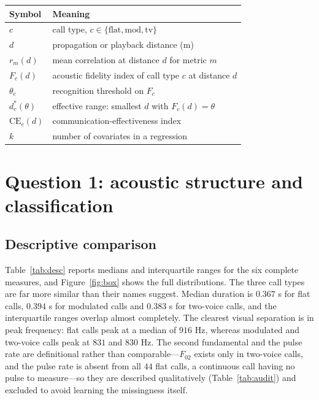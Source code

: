 \documentclass{apmcmthesis}
\begin{document}
\begin{center}
\footnotesize
\begin{tabular}{ll}
\toprule
Symbol & Meaning\\
\midrule
$c$ & call type, $c\in\{\text{flat},\text{mod},\text{tv}\}$\\
$d$ & propagation or playback distance (m)\\
$r_{m}(d)$ & mean correlation at distance $d$ for metric $m$\\
$F_c(d)$ & acoustic fidelity index of call type $c$ at distance $d$\\
$\theta_c$ & recognition threshold on $F_c$\\
$d^{*}_{c}(\theta)$ & effective range: smallest $d$ with $F_c(d)=\theta$\\
$\mathrm{CE}_c(d)$ & communication-effectiveness index\\
$k$ & number of covariates in a regression\\
\bottomrule
\end{tabular}
\end{center}

\section{Question 1: acoustic structure and classification}\label{sec:q1}

\subsection{Descriptive comparison}

Table~\ref{tab:desc} reports medians and interquartile ranges for the six complete
measures, and Figure~\ref{fig:box} shows the full distributions. The three call types
are far more similar than their names suggest. Median duration is $0.367$ s for flat
calls, $0.394$ s for modulated calls and $0.383$ s for two-voice calls, and the
interquartile ranges overlap almost completely. The clearest visual separation is in peak
frequency: flat calls peak at a median of $916$ Hz, whereas modulated and two-voice calls
peak at $831$ and $830$ Hz. The second fundamental and the pulse rate are definitional
rather than comparable---$F_{02}$ exists only in two-voice calls, and the pulse rate is
absent from all $44$ flat calls, a continuous call having no pulse to measure---so they
are described qualitatively (Table~\ref{tab:audit}) and excluded to avoid learning the
missingness itself.
\end{document}
